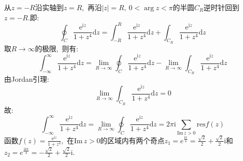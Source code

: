 \documentclass[a4paper,fontset=windows]{ctexart}
\begin{document}
\begin{itemize}
从$z=-R$沿实轴到$z=R$,\ 再沿$|z|=R,\ 0<\arg z<\pi$的半圆$C_R$逆时针回到$z=-R$.即:
\[
\oint_{C}\frac{\mathrm{e}^{\mathrm{i}z}}{1+z^4}\mathrm{d}z
=\int_{-R}^{R}\frac{\mathrm{e}^{\mathrm{i}z}}{1+z^4}\mathrm{d}z+\int_{C_R}\frac{\mathrm{e}^{\mathrm{i}z}}{1+z^4}\mathrm{d}z
\]
取$R\rightarrow\infty$的极限,\ 则有:
\[
\int_{-\infty}^{\infty}\frac{\mathrm{e}^{\mathrm{i}z}}{1+z^4}\mathrm{d}z
=\lim_{R \to \infty}\oint_{C}\frac{\mathrm{e}^{\mathrm{i}z}}{1+z^4}\mathrm{d}z-\lim_{R \to \infty}\int_{C_R}\frac{\mathrm{e}^{\mathrm{i}z}}{1+z^4}\mathrm{d}z
\]
由Jordan引理:
\[
\lim_{R \to \infty}\int_{C_R}\frac{\mathrm{e}^{\mathrm{i}z}}{1+z^4}\mathrm{d}z=0
\]
故:
\[
\int_{-\infty}^{\infty}\frac{\mathrm{e}^{\mathrm{i}z}}{1+z^4}\mathrm{d}z
=\lim_{R \to \infty}\oint_{C}\frac{\mathrm{e}^{\mathrm{i}z}}{1+z^4}\mathrm{d}z
=2\pi\mathrm{i}\sum_{\mathrm{Im}\,z>0}\mathrm{res}f(z)
\]
函数$f(z)=\frac{\mathrm{e}^{\mathrm{i}z}}{1+z^4}$,\ 在$\mathrm{Im}\,z>0$的区域内有两个奇点$z_1=e^{\frac{\mathrm{i}\pi}{4}}=\frac{\sqrt2}{2}+\frac{\sqrt2}{2}\mathrm{i}$和$z_2=e^{\frac{\mathrm{i}3\pi}{4}}=-\frac{\sqrt2}{2}+\frac{\sqrt2}{2}\mathrm{i}$.


\end{itemize}
\end{document}
